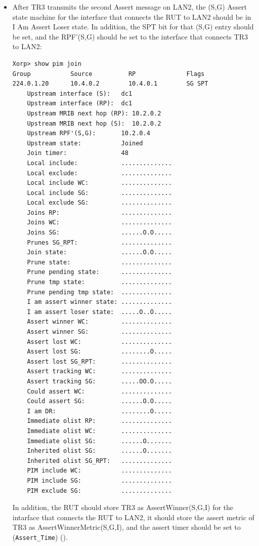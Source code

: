 \documentclass[11pt]{report}
\begin{document}
\begin{itemize}
  \item After TR3 transmits the second Assert message on LAN2, the (S,G) Assert
  state machine for the interface that connects the RUT to LAN2 should be in I
  Am Assert Loser state. In addition, the SPT bit for that (S,G) entry should
  be set, and the RPF'(S,G) should be set to the interface that connects TR3
  to LAN2:

\begin{verbatim}
Xorp> show pim join 
Group           Source          RP              Flags
224.0.1.20      10.4.0.2        10.4.0.1        SG SPT 
    Upstream interface (S):   dc1
    Upstream interface (RP):  dc1
    Upstream MRIB next hop (RP): 10.2.0.2
    Upstream MRIB next hop (S):  10.2.0.2
    Upstream RPF'(S,G):       10.2.0.4
    Upstream state:           Joined 
    Join timer:               48
    Local include:            ..............
    Local exclude:            ..............
    Local include WC:         ..............
    Local include SG:         ..............
    Local exclude SG:         ..............
    Joins RP:                 ..............
    Joins WC:                 ..............
    Joins SG:                 ......O.O.....
    Prunes SG_RPT:            ..............
    Join state:               ......O.O.....
    Prune state:              ..............
    Prune pending state:      ..............
    Prune tmp state:          ..............
    Prune pending tmp state:  ..............
    I am assert winner state: ..............
    I am assert loser state:  .....O..O.....
    Assert winner WC:         ..............
    Assert winner SG:         ..............
    Assert lost WC:           ..............
    Assert lost SG:           ........O.....
    Assert lost SG_RPT:       ..............
    Assert tracking WC:       ..............
    Assert tracking SG:       .....OO.O.....
    Could assert WC:          ..............
    Could assert SG:          ......O.O.....
    I am DR:                  ........O.....
    Immediate olist RP:       ..............
    Immediate olist WC:       ..............
    Immediate olist SG:       ......O.......
    Inherited olist SG:       ......O.......
    Inherited olist SG_RPT:   ..............
    PIM include WC:           ..............
    PIM include SG:           ..............
    PIM exclude SG:           ..............
\end{verbatim}

  In addition, the RUT should store TR3 as AssertWinner(S,G,I) for the
  intarface that connects the RUT to LAN2, it should store the assert metric
  of TR3 as AssertWinnerMetric(S,G,I), and the assert timer should be set to
  (\verb=Assert_Time=) ({\PimsmAssertTime}).

\end{itemize}
\end{document}
